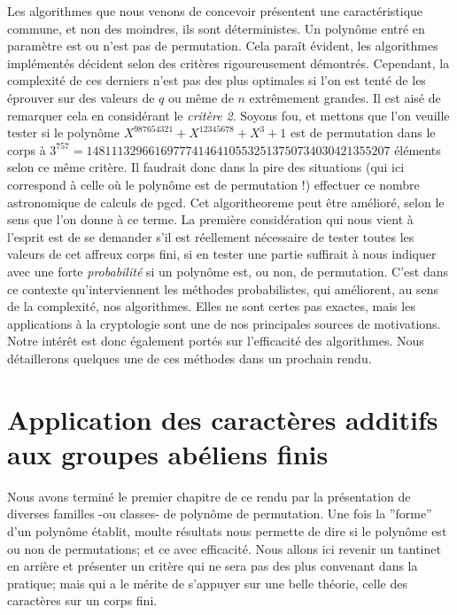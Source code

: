 \documentclass[12pt]{article}
\theoremstyle{remark}\newtheorem{note}{Note}
\theoremstyle{remark}\newtheorem{nota}{Notation}
\theoremstyle{definition}
\begin{document}
Les algorithmes que nous venons de concevoir présentent une caractéristique commune, et non des moindres, ils sont déterministes. Un polynôme entré en paramètre est ou n'est pas de permutation. Cela paraît évident, les algorithmes implémentés décident selon des critères rigoureusement démontrés. Cependant, la complexité de ces derniers n'est pas des plus optimales si l'on est tenté de les éprouver sur des valeurs de $q$ ou même de $n$ extrêmement grandes. Il est aisé de remarquer cela en considérant le \textit{critère 2}. Soyons fou, et mettons que l'on veuille tester si le polynôme $X^{987654321} + X^{12345678} + X^3 + 1$ est de permutation dans le corps à $3^{757} = 1481113296616977741464105532513750734030421355207$ éléments selon ce même critère. Il faudrait donc dans la pire des situations (qui ici correspond à celle où le polynôme est de permutation !) effectuer ce nombre astronomique de calculs de pgcd. Cet algoritheoreme peut être amélioré, selon le sens que l'on donne à ce terme. La première considération qui nous vient à l'esprit est de se demander s'il est réellement nécessaire de tester toutes les valeurs de cet affreux corps fini, si en tester une partie suffirait à nous indiquer avec une forte \textit{probabilité} si un polynôme est, ou non, de permutation. C'est dans ce contexte qu'interviennent les méthodes probabilistes, qui améliorent, au sens de la complexité, nos algorithmes. Elles ne sont certes pas exactes, mais les applications à la cryptologie sont une de nos principales sources de motivations. Notre intérêt est donc également portés sur l'efficacité des algorithmes.
Nous détaillerons quelques une de ces méthodes dans un prochain rendu.

\pagebreak


\section{Application des caractères additifs aux groupes abéliens finis}

Nous avons terminé le premier chapitre de ce rendu par la présentation de diverses familles -ou classes- de polynôme de permutation. Une fois la ''forme'' d'un polynôme établit, moulte résultats nous permette de dire si le polynôme est ou non de permutations; et ce avec efficacité. \newline
Nous allons ici revenir un tantinet en arrière et présenter un critère qui ne sera pas des plus convenant dans la pratique; mais qui a le mérite de s'appuyer sur une belle théorie, celle des caractères sur un corps fini.
\end{document}
